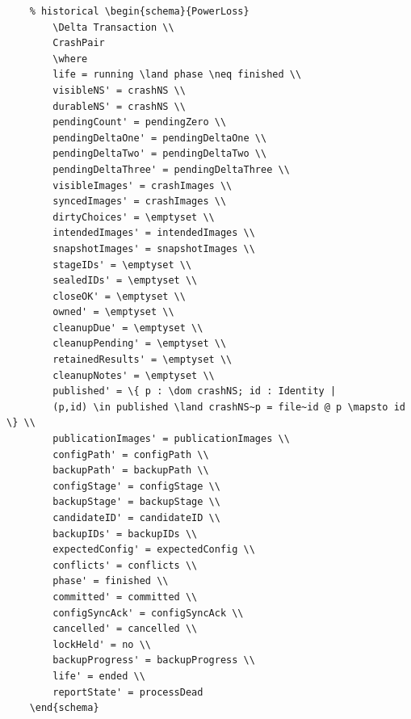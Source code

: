 \documentclass{article}
\begin{document}
\begin{verbatim}
	% historical \begin{schema}{PowerLoss}
		\Delta Transaction \\
		CrashPair
		\where
		life = running \land phase \neq finished \\
		visibleNS' = crashNS \\
		durableNS' = crashNS \\
		pendingCount' = pendingZero \\
		pendingDeltaOne' = pendingDeltaOne \\
		pendingDeltaTwo' = pendingDeltaTwo \\
		pendingDeltaThree' = pendingDeltaThree \\
		visibleImages' = crashImages \\
		syncedImages' = crashImages \\
		dirtyChoices' = \emptyset \\
		intendedImages' = intendedImages \\
		snapshotImages' = snapshotImages \\
		stageIDs' = \emptyset \\
		sealedIDs' = \emptyset \\
		closeOK' = \emptyset \\
		owned' = \emptyset \\
		cleanupDue' = \emptyset \\
		cleanupPending' = \emptyset \\
		retainedResults' = \emptyset \\
		cleanupNotes' = \emptyset \\
		published' = \{ p : \dom crashNS; id : Identity |
		(p,id) \in published \land crashNS~p = file~id @ p \mapsto id \} \\
		publicationImages' = publicationImages \\
		configPath' = configPath \\
		backupPath' = backupPath \\
		configStage' = configStage \\
		backupStage' = backupStage \\
		candidateID' = candidateID \\
		backupIDs' = backupIDs \\
		expectedConfig' = expectedConfig \\
		conflicts' = conflicts \\
		phase' = finished \\
		committed' = committed \\
		configSyncAck' = configSyncAck \\
		cancelled' = cancelled \\
		lockHeld' = no \\
		backupProgress' = backupProgress \\
		life' = ended \\
		reportState' = processDead
	\end{schema}


\end{verbatim}
\end{document}
